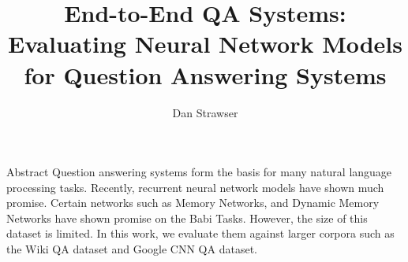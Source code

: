 \documentclass{beamer}
\title[Crisis]{End-to-End QA Systems:  Evaluating Neural Network Models for Question Answering Systems}
\author{Dan Strawser}
\begin{document}
\frame{\titlepage}

\begin{frame}{Abstract}
Question answering systems form the basis for many natural language processing tasks.  Recently, recurrent neural network models have shown much promise.  Certain networks such as Memory Networks, and Dynamic Memory Networks have shown promise on the Babi Tasks. However, the size of this dataset is limited.  In this work, we evaluate them against larger corpora such as the Wiki QA dataset and Google CNN QA dataset.  
\end{frame}
\end{document}
